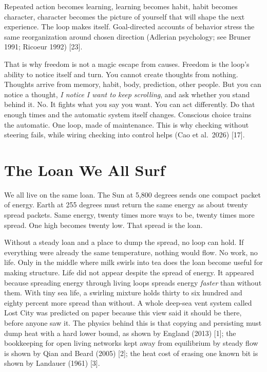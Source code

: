 \documentclass[11pt,a4paper]{article}
\begin{document}
Repeated action becomes learning, learning becomes habit, habit becomes character, character becomes the picture of yourself that will shape the next experience. The loop makes itself. Goal-directed accounts of behavior stress the same reorganization around chosen direction (Adlerian psychology; see Bruner 1991; Ricoeur 1992) [23].

That is why freedom is not a magic escape from causes. Freedom is the loop's ability to notice itself and turn. You cannot create thoughts from nothing. Thoughts arrive from memory, habit, body, prediction, other people. But you can notice a thought, \textit{I notice I want to keep scrolling}, and ask whether you stand behind it. No. It fights what you say you want. You can act differently. Do that enough times and the automatic system itself changes. Conscious choice trains the automatic. One loop, made of maintenance. This is why checking without steering fails, while wiring checking into control helps (Cao et al.\ 2026) [17].

\section{The Loan We All Surf}

We all live on the same loan. The Sun at 5,800 degrees sends one compact packet of energy. Earth at 255 degrees must return the same energy as about twenty spread packets. Same energy, twenty times more ways to be, twenty times more spread. One high becomes twenty low. That spread is the loan.

Without a steady loan and a place to dump the spread, no loop can hold. If everything were already the same temperature, nothing would flow. No work, no life. Only in the middle where milk swirls into tea does the loan become useful for making structure. Life did not appear despite the spread of energy. It appeared because spreading energy through living loops spreads energy \emph{faster} than without them. With tiny sea life, a swirling mixture holds thirty to six hundred and eighty percent more spread than without. A whole deep-sea vent system called Lost City was predicted on paper because this view said it should be there, before anyone saw it. The physics behind this is that copying and persisting must dump heat with a hard lower bound, as shown by England (2013) [1]; the bookkeeping for open living networks kept away from equilibrium by steady flow is shown by Qian and Beard (2005) [2]; the heat cost of erasing one known bit is shown by Landauer (1961) [3].
\end{document}

